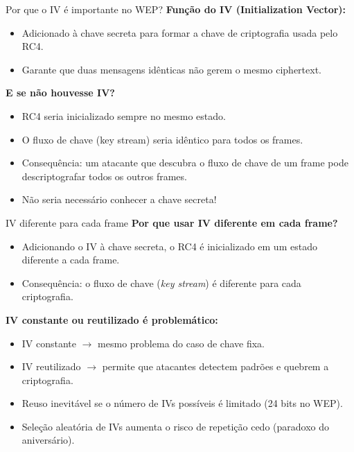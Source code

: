 \begin{frame}{Por que o IV é importante no WEP?}
\textbf{Função do IV (Initialization Vector):}  
\begin{itemize}
    \item Adicionado à chave secreta para formar a chave de criptografia usada pelo RC4.
    \item Garante que duas mensagens idênticas não gerem o mesmo ciphertext.
\end{itemize}

\medskip
\textbf{E se não houvesse IV?}  
\begin{itemize}
    \item RC4 seria inicializado sempre no mesmo estado.
    \item O fluxo de chave (key stream) seria idêntico para todos os frames.
    \item Consequência: um atacante que descubra o fluxo de chave de um frame pode descriptografar todos os outros frames.
    \item Não seria necessário conhecer a chave secreta!
\end{itemize}
\end{frame}

\begin{frame}{IV diferente para cada frame}
\textbf{Por que usar IV diferente em cada frame?}
\begin{itemize}
    \item Adicionando o IV à chave secreta, o RC4 é inicializado em um estado diferente a cada frame.
    \item Consequência: o fluxo de chave (\emph{key stream}) é diferente para cada criptografia.
\end{itemize}

\medskip
\textbf{IV constante ou reutilizado é problemático:}
\begin{itemize}
    \item IV constante $\rightarrow$ mesmo problema do caso de chave fixa.
    \item IV reutilizado $\rightarrow$ permite que atacantes detectem padrões e quebrem a criptografia.
    \item Reuso inevitável se o número de IVs possíveis é limitado (24 bits no WEP).
    \item Seleção aleatória de IVs aumenta o risco de repetição cedo (paradoxo do aniversário).
\end{itemize}
\end{frame}

